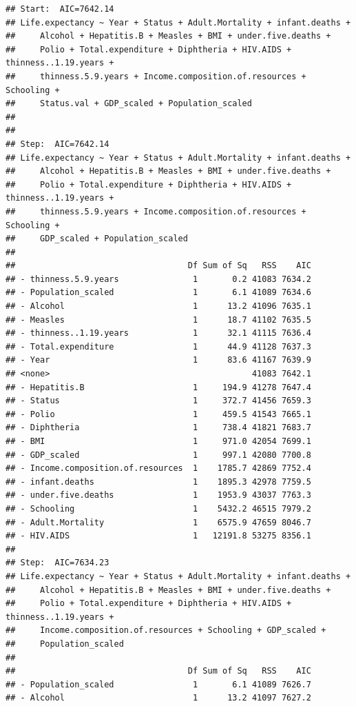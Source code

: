\documentclass[
]{article}
\begin{document}
\begin{verbatim}
## Start:  AIC=7642.14
## Life.expectancy ~ Year + Status + Adult.Mortality + infant.deaths + 
##     Alcohol + Hepatitis.B + Measles + BMI + under.five.deaths + 
##     Polio + Total.expenditure + Diphtheria + HIV.AIDS + thinness..1.19.years + 
##     thinness.5.9.years + Income.composition.of.resources + Schooling + 
##     Status.val + GDP_scaled + Population_scaled
## 
## 
## Step:  AIC=7642.14
## Life.expectancy ~ Year + Status + Adult.Mortality + infant.deaths + 
##     Alcohol + Hepatitis.B + Measles + BMI + under.five.deaths + 
##     Polio + Total.expenditure + Diphtheria + HIV.AIDS + thinness..1.19.years + 
##     thinness.5.9.years + Income.composition.of.resources + Schooling + 
##     GDP_scaled + Population_scaled
## 
##                                   Df Sum of Sq   RSS    AIC
## - thinness.5.9.years               1       0.2 41083 7634.2
## - Population_scaled                1       6.1 41089 7634.6
## - Alcohol                          1      13.2 41096 7635.1
## - Measles                          1      18.7 41102 7635.5
## - thinness..1.19.years             1      32.1 41115 7636.4
## - Total.expenditure                1      44.9 41128 7637.3
## - Year                             1      83.6 41167 7639.9
## <none>                                         41083 7642.1
## - Hepatitis.B                      1     194.9 41278 7647.4
## - Status                           1     372.7 41456 7659.3
## - Polio                            1     459.5 41543 7665.1
## - Diphtheria                       1     738.4 41821 7683.7
## - BMI                              1     971.0 42054 7699.1
## - GDP_scaled                       1     997.1 42080 7700.8
## - Income.composition.of.resources  1    1785.7 42869 7752.4
## - infant.deaths                    1    1895.3 42978 7759.5
## - under.five.deaths                1    1953.9 43037 7763.3
## - Schooling                        1    5432.2 46515 7979.2
## - Adult.Mortality                  1    6575.9 47659 8046.7
## - HIV.AIDS                         1   12191.8 53275 8356.1
## 
## Step:  AIC=7634.23
## Life.expectancy ~ Year + Status + Adult.Mortality + infant.deaths + 
##     Alcohol + Hepatitis.B + Measles + BMI + under.five.deaths + 
##     Polio + Total.expenditure + Diphtheria + HIV.AIDS + thinness..1.19.years + 
##     Income.composition.of.resources + Schooling + GDP_scaled + 
##     Population_scaled
## 
##                                   Df Sum of Sq   RSS    AIC
## - Population_scaled                1       6.1 41089 7626.7
## - Alcohol                          1      13.2 41097 7627.2

\end{verbatim}
\end{document}
